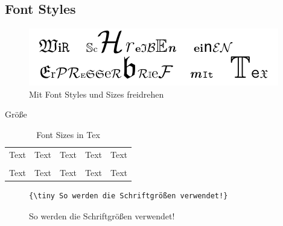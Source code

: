 \documentclass[14pt,aspectratio=169]{beamer}
\begin{document}
\subsection{Font Styles}

\begin{frame}{\insertsubsection}
    \begin{figure}
        \includegraphics[width=\textwidth]{pictures/erpresserbrief.pdf}
        \caption{Mit Font Styles und Sizes freidrehen}
    \end{figure}
\end{frame}


\begin{frame}[fragile]{\insertsubsection \quad\small Größe}
    \begin{table}
        \begin{tabular}{c|c|c|c|c}
            \texttt{\tiny}  & \texttt{\scriptsize} 
            & \texttt{\footnotesize} & \texttt{\small} 
                & \texttt{\normalsize} \\
            \hline
            {\tiny Text}             & {\scriptsize Text}
            & {\footnotesize Text}            & {\small Text}
                & {\normalsize Text}            \\
            \hline\hline
            \texttt{\large} & \texttt{\Large} 
            & \texttt{\LARGE}        & \texttt{\huge} 
                & \texttt{\Huge} \\
            \hline
            {\large Text}            & {\Large Text}
            & {\LARGE Text}                   & {\huge Text}            
                & {\Huge Text} 
        \end{tabular}
        \caption{Font Sizes in Tex}
    \end{table}

    \vspace{-0.5em}
    
    \begin{Beispiel}
        \begin{figure}
            \vspace{-0.5em}
            \begin{verbatim}
{\tiny So werden die Schriftgrößen verwendet!}
            \end{verbatim}
            \vspace{.5em}
            {\tiny So werden die Schriftgrößen verwendet!}
        \end{figure}
        \vspace{-0.5em}
    \end{Beispiel}
\end{frame}
\end{document}
